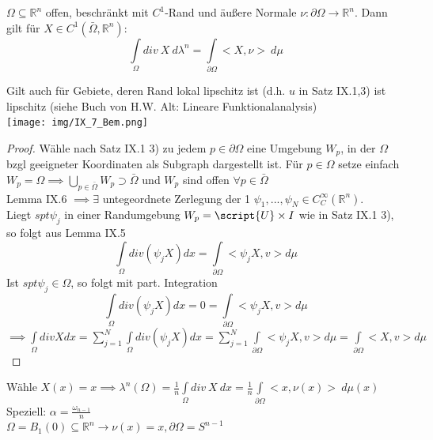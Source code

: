 \begin{theorem}
  $\Omega \subseteq \mathbb{R}^n$ offen, beschränkt mit $C^1$-Rand und äußere Normale $\nu:\partial\Omega\to\mathbb{R}^n$. Dann gilt für $X\in C^1(\bar{\Omega}, \mathbb{R}^n)$:
  $$\int\limits_{\Omega} div \ X \ d\lambda^n = \int\limits_{\partial\Omega} <X, \nu> \ d\mu$$
\end{theorem}

\begin{remark}
  Gilt auch für Gebiete, deren Rand lokal lipschitz ist (d.h. $u$ in Satz IX.1,3) ist lipschitz (siehe Buch von H.W. Alt: Lineare Funktionalanalysis) \\
  \texttt{[image: img/IX\_7\_Bem.png]}
\end{remark}

\begin{proof}
	Wähle nach Satz IX.1 3) zu jedem $p\in \partial\Omega$ eine Umgebung $W_p$, in der $\Omega$ bzgl geeigneter Koordinaten als Subgraph dargestellt ist. Für $p\in \Omega$ setze einfach $W_p = \Omega \implies \bigcup\limits_{p\in\bar{\Omega}} W_p \supset \bar{\Omega}$ und $W_p$ sind offen $\forall p\in \bar{\Omega}$ \\
	Lemma IX.6 $\implies\exists$ untegeordnete Zerlegung der 1 $\psi_1, ..., \psi_N \in C^\infty_C (\mathbb{R}^n)$. \\
	Liegt $spt \psi_j$ in einer Randumgebung $W_p = \script{U}\times I$ wie in Satz IX.1 3), so folgt aus Lemma IX.5 $$ \int\limits_\Omega div (\psi_j X) dx = \int\limits_{\partial\Omega} < \psi_j X, v> d\mu$$
	Ist $spt \psi_j \in \Omega$, so folgt mit part. Integration $$\int\limits_\Omega div(\psi_j X) dx = 0 = \int\limits_{\partial\Omega} <\psi_j X, v> d\mu$$ 
	$\implies \int\limits_\Omega div X dx = \sum\limits_{j=1}^N \int\limits_\Omega div(\psi_j X) dx = \sum\limits_{j=1}^N \int\limits_{\partial\Omega} <\psi_j X, v> d\mu = \int\limits_{\partial\Omega}<X,v> d\mu$
\end{proof}
\begin{example}
  Wähle $X(x) = x \implies \lambda^n(\Omega) = \frac{1}{n} \int\limits_{\Omega} div \ X \ dx = \frac{1}{n} \int\limits_{\partial \Omega} <x, \nu(x)> \ d\mu(x)$\\
  Speziell: $\alpha = \frac{\omega_{n-1}}{n}$\\
  $\Omega = B_1(0) \subseteq \mathbb{R}^n \rightarrow \nu(x) = x, \partial\Omega = S^{n-1}$ 
\end{example}

